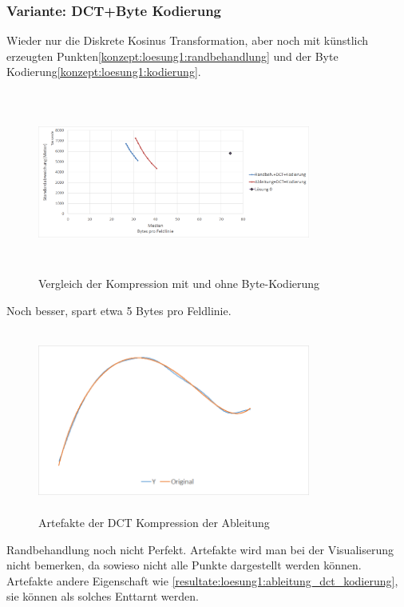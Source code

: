 \subsubsection{Variante: DCT+Byte Kodierung}
Wieder nur die Diskrete Kosinus Transformation, aber noch mit künstlich erzeugten Punkten\ref{konzept:loesung1:randbehandlung} und der Byte Kodierung\ref{konzept:loesung1:kodierung}.
\begin{figure}[!htbp]
	\center
	\includegraphics[width=0.8\textwidth,height=6cm,keepaspectratio]{./pictures/resultate/loesung1/loesung1-7/loesung1_7.png}
	\caption{Vergleich der Kompression mit und ohne Byte-Kodierung}
	\label{resultate:loesung1:dct:randbehandlung}
\end{figure}
Noch besser, spart etwa 5 Bytes pro Feldlinie. 
\begin{figure}[!htbp]
	\center
	\includegraphics[width=0.8\textwidth,height=6cm,keepaspectratio]{./pictures/resultate/loesung1/loesung1-7/artefakte.png}
	\caption{Artefakte der DCT Kompression der Ableitung}
	\label{resultate:loesung1:dct:randbehandlung:artefakte:}
\end{figure} 
Randbehandlung noch nicht Perfekt.
Artefakte wird man bei der Visualiserung nicht bemerken, da sowieso nicht alle Punkte dargestellt werden können. Artefakte andere Eigenschaft wie \ref{resultate:loesung1:ableitung_dct_kodierung}, sie können als solches Enttarnt werden.
